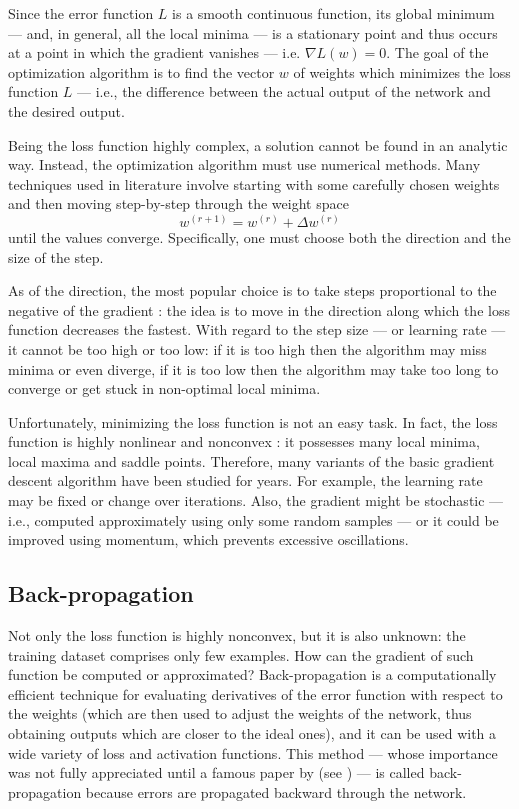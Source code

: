             Since the error function \(L\) is a smooth continuous function, its global minimum --- and, in general, all the local minima --- is a stationary point and thus occurs at a point in which the gradient vanishes --- i.e. \(\nabla L\left(w\right) = 0\). The goal of the optimization algorithm is to find the vector \(w\) of weights which minimizes the loss function \(L\) --- i.e., the difference between the actual output of the network and the desired output.
            
            Being the loss function highly complex, a solution cannot be found in an analytic way. Instead, the optimization algorithm must use numerical methods. Many techniques used in literature involve starting with some carefully chosen weights and then moving step-by-step through the weight space
            \[w^{\left(r+1\right)} = w^{\left(r\right)} + \Delta w^{\left(r\right)}\]
            until the values converge. Specifically, one must choose both the direction and the size of the step.
            
            As of the direction, the most popular choice is to take steps proportional to the negative of the gradient \cite[240]{Bishop}: the idea is to move in the direction along which the loss function decreases the fastest. With regard to the step size --- or learning rate --- it cannot be too high or too low: if it is too high then the algorithm may miss minima or even diverge, if it is too low then the algorithm may take too long to converge or get stuck in non-optimal local minima.
            
            Unfortunately, minimizing the loss function is not an easy task. In fact, the loss function is highly nonlinear and nonconvex \cite[400]{Hastie}\cite[237]{Bishop}: it possesses many local minima, local maxima and saddle points. Therefore, many variants of the basic gradient descent algorithm have been studied for years. For example, the learning rate may be fixed or change over iterations. Also, the gradient might be stochastic --- i.e., computed approximately using only some random samples --- or it could be improved using momentum, which prevents excessive oscillations.
        \subsection{Back-propagation}
            Not only the loss function is highly nonconvex, but it is also unknown: the training dataset comprises only few examples. How can the gradient of such function be computed or approximated? Back-propagation is a computationally efficient technique for evaluating derivatives of the error function with respect to the weights (which are then used to adjust the weights of the network, thus obtaining outputs which are closer to the ideal ones), and it can be used with a wide variety of loss and activation functions. This method --- whose importance was not fully appreciated until a famous \citeyear{Rumelhart} paper by \citeauthor{Rumelhart} (see \cite{Rumelhart}) --- is called back-propagation because errors are propagated backward through the network.
            
